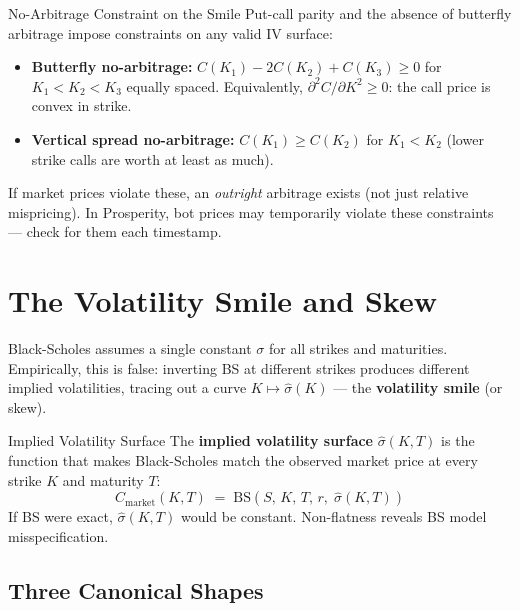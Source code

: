 \documentclass[12pt,a4paper,openany]{report}
\theoremstyle{definition}
\begin{document}
\begin{warningbox}{No-Arbitrage Constraint on the Smile}
Put-call parity and the absence of butterfly arbitrage impose constraints on any valid IV surface:
\begin{itemize}
  \item \textbf{Butterfly no-arbitrage:} $C(K_1) - 2C(K_2) + C(K_3) \geq 0$ for $K_1 < K_2 < K_3$ equally spaced. Equivalently, $\partial^2 C / \partial K^2 \geq 0$: the call price is convex in strike.
  \item \textbf{Vertical spread no-arbitrage:} $C(K_1) \geq C(K_2)$ for $K_1 < K_2$ (lower strike calls are worth at least as much).
\end{itemize}
If market prices violate these, an \emph{outright} arbitrage exists (not just relative mispricing). In Prosperity, bot prices may temporarily violate these constraints — check for them each timestamp.
\end{warningbox}

\section{The Volatility Smile and Skew}

Black-Scholes assumes a single constant $\sigma$ for all strikes and maturities. Empirically, this is false: inverting BS at different strikes produces different implied volatilities, tracing out a curve $K \mapsto \hat{\sigma}(K)$ — the \textbf{volatility smile} (or skew).

\begin{definitionbox}{Implied Volatility Surface}
The \textbf{implied volatility surface} $\hat{\sigma}(K, T)$ is the function that makes Black-Scholes match the observed market price at every strike $K$ and maturity $T$:
\[
  C_{\text{market}}(K, T) \;=\; \text{BS}\!\left(S,\, K,\, T,\, r,\; \hat{\sigma}(K,T)\right)
\]
If BS were exact, $\hat{\sigma}(K,T)$ would be constant. Non-flatness reveals BS model misspecification.
\end{definitionbox}

\subsection{Three Canonical Shapes}
\end{document}
